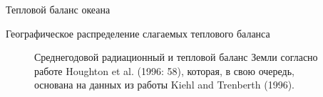 \begin{chapter}{Тепловой баланс океана}
\begin{section}{Географическое распределение слагаемых теплового баланса}
\begin{figure}[t!]
\caption{Среднегодовой радиационный и тепловой баланс Земли согласно
работе Houghton et al. (1996: 58), которая, в свою очередь, основана на
данных из работы Kiehl and Trenberth (1996).}
\label{fig:heatbudget}
\end{figure}
%


\end{section}
\end{chapter}
